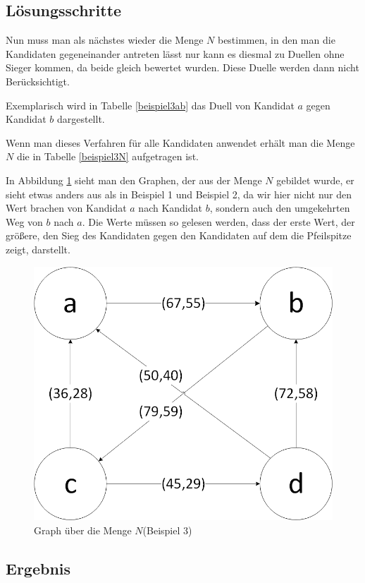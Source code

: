 \subsection{Lösungsschritte} 
\label{sec:loesungen3}
Nun muss man als nächstes wieder die Menge $N$ bestimmen, in den man die Kandidaten gegeneinander antreten lässt nur kann es diesmal zu Duellen ohne Sieger kommen, da beide gleich bewertet wurden. Diese Duelle werden dann nicht Berücksichtigt. 

Exemplarisch wird in Tabelle \ref{beispiel3ab} das Duell von Kandidat $a$ gegen Kandidat $b$ dargestellt. 




Wenn man dieses Verfahren für alle Kandidaten anwendet erhält man die Menge $N$ die in Tabelle \ref{beispiel3N} aufgetragen ist.



In Abbildung \ref{fig:graph3} sieht man den Graphen, der aus der Menge $N$ gebildet wurde, er sieht etwas anders aus als in Beispiel 1 und Beispiel 2, da wir hier nicht nur den Wert brachen von Kandidat $a$ nach Kandidat $b$, sondern auch den umgekehrten Weg von $b$ nach $a$. Die Werte müssen so gelesen werden, dass der erste Wert, der größere, den Sieg des Kandidaten gegen den Kandidaten auf dem die Pfeilspitze zeigt, darstellt.

\begin{figure}[!h]
\centering
\includegraphics[scale=0.5]{Bilder/Beispiel3_Graph.png}
\caption{Graph über die Menge $N$(Beispiel 3)}
\label{fig:graph3}
\end{figure}

\subsection{Ergebnis} 
\label{sec:ergebnis3}

